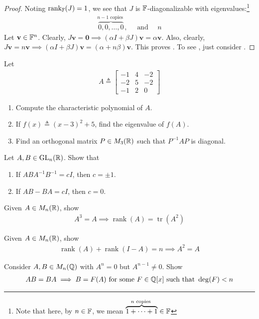 \documentclass{report}
\begin{document}
\begin{proof}
Noting $\operatorname{rank}_{\mathbb{F}}(J)=1$, we see that $J$ is $\mathbb{F}$-diagonalizable with eigenvalues:\footnote{Note that here, by $n \in \mathbb{F}$, we mean  $\overbrace{1+\cdots +1}^{n\text{ copies }} \in \mathbb{F}$}
\begin{align*}
\overbrace{0,0,\dots ,0}^{n-1\text{ copies }},\quad \text{ and }\quad n
\end{align*}
Let $\textbf{v}\in \mathbb{F}^n$. Clearly, $J\textbf{v}=\textbf{0}\implies (\alpha I+\beta J)\textbf{v}=\alpha \textbf{v}$. Also, clearly,   $J\textbf{v}=n\textbf{v}\implies (\alpha I+\beta J)\textbf{v}=(\alpha +n\beta )\textbf{v}$. This proves . To see , just consider .  
\end{proof}
\begin{question}{}{}
Let 
\begin{align*}
A\triangleq \begin{bmatrix}
  -1 & 4 & -2 \\
  -2 & 5 & -2 \\
  -1 & 2 & 0
\end{bmatrix}
\end{align*}
\begin{enumerate}[label=(\roman*)]
  \item Compute the characteristic polynomial of $A$.  
  \item If $f(x)\triangleq (x-3)^2+5$, find the eigenvalue of $f(A)$. 
  \item Find an orthogonal matrix $P \in M_3(\mathbb{R})$ such that $P^{-1}AP$ is diagonal. 
\end{enumerate}
\end{question}
\begin{question}{}{}
Let $A,B \in \operatorname{GL}_n(\mathbb{R})$. Show that 
\begin{enumerate}[label=(\roman*)]
  \item If $ABA^{-1}B^{-1}=cI$, then $c=\pm 1$. 
  \item If $AB-BA=cI$, then  $c=0$. 
\end{enumerate}
\end{question}
\begin{question}{}{}
Given $A \in M_n(\mathbb{R})$, show 
\begin{align*}
A^3=A \implies \operatorname{rank}(A)=\operatorname{tr}(A^2)
\end{align*}
\end{question}
\begin{question}{}{}
Given $A \in M_n(\mathbb{R})$, show 
\begin{align*}
\operatorname{rank}(A)+\operatorname{rank}(I-A) =n\implies A^2=A
\end{align*}
\end{question}
\begin{question}{}{}
Consider $A,B\in M_n(\mathbb{Q})$ with $A^n=0$ but  $A^{n-1}\neq 0$. Show 
\begin{align*}
AB=BA \implies  B= F(A)\text{ for some }F \in \mathbb{Q}[x]\text{ such that }\operatorname{deg}(F)<n
\end{align*}
\end{question}
\end{document}
